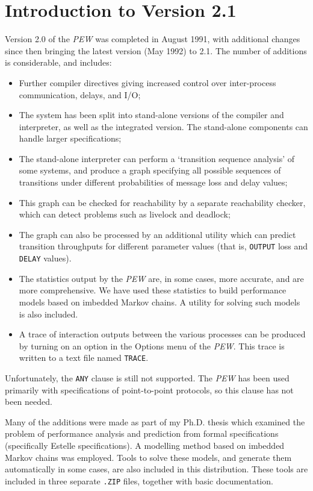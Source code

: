 \section[Introduction to Version 2.1]{Introduction to Version 2.1}

Version 2.0 of the {\em PEW} was completed in August 1991, with
additional changes since then bringing the latest version (May 1992)
to 2.1. The number of additions is considerable, and includes:

\begin{itemize}
\item Further compiler directives giving increased control over
inter-process communication, delays, and I/O;
\item The system has been split into stand-alone versions of the
compiler and interpreter, as well as the integrated version. The
stand-alone components can handle larger specifications;
\item The stand-alone interpreter can perform a `transition sequence
analysis' of some systems, and produce a graph specifying all
possible sequences of transitions under different probabilities of
message loss and delay values;
\item This graph can be checked for reachability by a separate
reachability checker, which can detect problems such as livelock and
deadlock;
\item The graph can also be processed by an additional utility which
can predict transition throughputs for different parameter values
(that is, {\tt OUTPUT} loss and {\tt DELAY} values).
\item The statistics output by the {\em PEW} are, in some cases, more
accurate, and are more comprehensive. We have used these statistics
to build performance models based on imbedded Markov chains. A
utility for solving such models is also included.
\item A trace of interaction outputs between the various processes
can be produced by turning on an option in the Options menu of the
{\em PEW}. This trace is written to a text file named {\tt TRACE}.
\end{itemize}

Unfortunately, the {\tt ANY} clause is still not supported. The {\em
PEW} has been used primarily with specifications of point-to-point
protocols, so this clause has not been needed.

Many of the additions were made as part of my Ph.D. thesis
which examined the problem of performance analysis
and prediction from formal specifications (specifically Estelle
specifications). A modelling method based on imbedded Markov chains
was employed. Tools to solve these models, and generate them
automatically in some cases, are also included in this distribution.
These tools are included in three separate {\tt .ZIP} files,
together with basic documentation.

